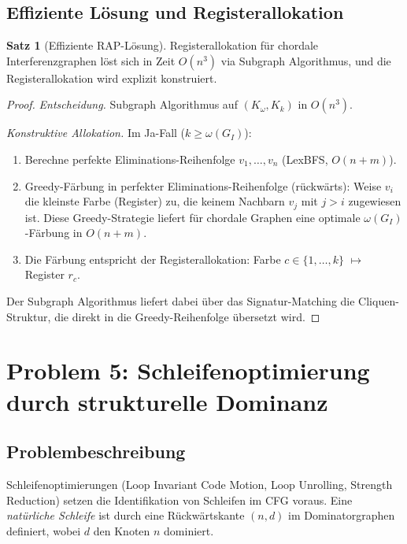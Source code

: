﻿\documentclass[a4paper,12pt]{article}
\theoremstyle{definition}
\newtheorem{satz}{Satz}
\begin{document}
\subsection{Effiziente Lösung und Registerallokation}

\begin{satz}[Effiziente RAP-Lösung]
Registerallokation für chordale Interferenzgraphen löst sich in Zeit $O(n^3)$ via Subgraph Algorithmus, und die Registerallokation wird explizit konstruiert.
\end{satz}

\begin{proof}
\textit{Entscheidung.} Subgraph Algorithmus auf $(K_{\omega}, K_k)$ in $O(n^3)$.

\textit{Konstruktive Allokation.} Im Ja-Fall ($k \geq \omega(G_I)$):
\begin{enumerate}
    \item Berechne perfekte Eliminations-Reihenfolge $v_1, \ldots, v_n$ (LexBFS, $O(n + m)$).
    \item Greedy-Färbung in perfekter Eliminations-Reihenfolge (rückwärts): Weise $v_i$ die kleinste Farbe (Register) zu, die keinem Nachbarn $v_j$ mit $j > i$ zugewiesen ist. Diese Greedy-Strategie liefert für chordale Graphen eine optimale $\omega(G_I)$-Färbung in $O(n + m)$.
    \item Die Färbung entspricht der Registerallokation: Farbe $c \in \{1, \ldots, k\}$ $\mapsto$ Register $r_c$.
\end{enumerate}

Der Subgraph Algorithmus liefert dabei über das Signatur-Matching die Cliquen-Struktur, die direkt in die Greedy-Reihenfolge übersetzt wird.
\end{proof}

\section{Problem 5: Schleifenoptimierung durch strukturelle Dominanz}
\label{sec:loop}

\subsection{Problembeschreibung}

Schleifenoptimierungen (Loop Invariant Code Motion, Loop Unrolling, Strength Reduction) setzen die Identifikation von Schleifen im CFG voraus. Eine \emph{natürliche Schleife} ist durch eine Rückwärtskante $(n, d)$ im Dominatorgraphen definiert, wobei $d$ den Knoten $n$ dominiert.
\end{document}
